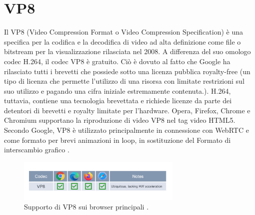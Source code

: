 \documentclass[11pt, a4paper, openany]{book}
\newcommand\blankpage{%
	\null
	\thispagestyle{empty}%
	\addtocounter{page}{-1}%
	\newpage}
\begin{document}
 	\afterpage{\blankpage}
 	
 	\appendix
 	\chapter{VP8}
 	Il VP8 (Video Compression Format o Video Compression Specification) è una specifica per la codifica e la decodifica di video ad alta definizione come file o bitstream per la visualizzazione rilasciata nel 2008. A differenza del suo omologo codec H.264, il codec VP8 è gratuito. Ciò è dovuto al fatto che Google ha rilasciato tutti i brevetti che possiede sotto una licenza pubblica royalty-free (un tipo di licenza che permette l'utilizzo di una risorsa con limitate restrizioni sul suo utilizzo e pagando una cifra iniziale estremamente contenuta.). H.264, tuttavia, contiene una tecnologia brevettata e richiede licenze da parte dei detentori di brevetti e royalty limitate per l’hardware. Opera, Firefox, Chrome e Chromium supportano la riproduzione di video VP8 nel tag video HTML5. Secondo Google, VP8 è utilizzato principalmente in connessione con WebRTC e come formato per brevi animazioni in loop, in sostituzione del Formato di interscambio grafico \cite{50}.
 	\begin{figure}[h!]
 		\centering
 		\includegraphics[width=0.7\textwidth]{img/VP8.png}
 		\caption{Supporto di VP8 sui browser principali \cite{74}.}
 	\end{figure}
\end{document}
